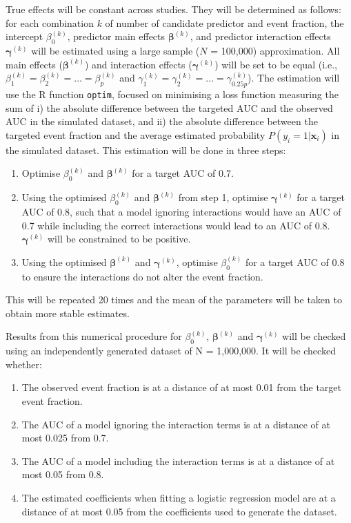 \documentclass{article}
\begin{document}
True effects will be constant across studies. They will be determined as follows: for each combination $k$ of number of candidate predictor and event fraction, the intercept $\beta_0^{(k)}$, predictor main effects $\boldsymbol\beta^{(k)}$, and predictor interaction effects $\boldsymbol\gamma^{(k)}$ will be estimated using a large sample ($N$ = 100,000) approximation. All main effects ($\boldsymbol\beta^{(k)}$) and interaction effects ($\boldsymbol\gamma^{(k)}$) will be set to be equal (i.e., $\beta_1^{(k)} = \beta_2^{(k)} = ... = \beta_p^{(k)}$ and $\gamma_1^{(k)} = \gamma_2^{(k)} = ... = \gamma_{0.25p}^{(k)}$). The estimation will use the R function \texttt{optim}, focused on minimising a loss function measuring the sum of i) the absolute difference between the targeted AUC and the observed AUC in the simulated dataset, and ii) the absolute difference between the targeted event fraction and the average estimated probability $P(y_i = 1|\mathbf{x}_i)$ in the simulated dataset. This estimation will be done in three steps:\begin{enumerate}
    \item Optimise $\beta_0^{(k)}$ and $\boldsymbol\beta^{(k)}$ for a target AUC of 0.7.
    \item Using the optimised $\beta_0^{(k)}$ and $\boldsymbol\beta^{(k)}$ from step 1, optimise $\boldsymbol\gamma^{(k)}$ for a target AUC of 0.8, such that a model ignoring interactions would have an AUC of 0.7 while including the correct interactions would lead to an AUC of 0.8. $\boldsymbol\gamma^{(k)}$ will be constrained to be positive.
    \item Using the optimised $\boldsymbol\beta^{(k)}$ and $\boldsymbol\gamma^{(k)}$, optimise $\beta_0^{(k)}$ for a target AUC of 0.8 to ensure the interactions do not alter the event fraction.
\end{enumerate}
This will be repeated 20 times and the mean of the parameters will be taken to obtain more stable estimates.

Results from this numerical procedure for $\beta_0^{(k)}$, $\boldsymbol\beta^{(k)}$ and $\boldsymbol\gamma^{(k)}$ will be checked using an independently generated dataset of N = 1,000,000. It will be checked whether:\begin{enumerate}
    \item The observed event fraction is at a distance of at most 0.01 from the target event fraction.
    \item The AUC of a model ignoring the interaction terms is at a distance of at most 0.025 from 0.7.
    \item The AUC of a model including the interaction terms is at a distance of at most 0.05 from 0.8.
    \item The estimated coefficients when fitting a logistic regression model are at a distance of at most 0.05 from the coefficients used to generate the dataset.
\end{enumerate}
\end{document}
